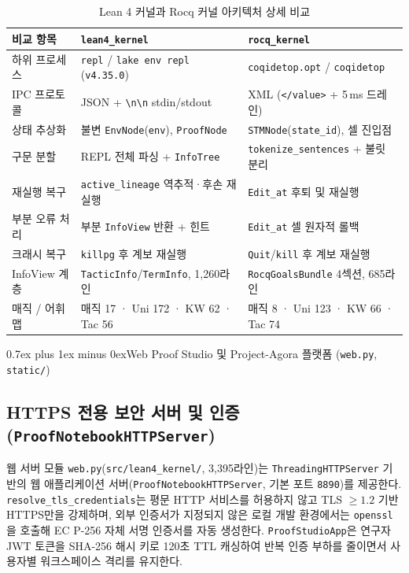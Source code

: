 \documentclass[journal]{IEEEtran}
\makeatletter
\def\section{\@startsection{section}{1}{\z@}{1.5ex plus 1.5ex minus 0.5ex}%
  {0.7ex plus 1ex minus 0ex}{\normalfont\normalsize\centering\bfseries}}%
\newcommand{\code}[1]{\texttt{#1}}
\makeatother
\begin{document}
\begin{table}[!t]
\caption{Lean 4 커널과 Rocq 커널 아키텍처 상세 비교}
\label{tab:lean_vs_rocq}
\centering
\scriptsize
\begin{tabularx}{\columnwidth}{@{}l X X@{}}
\toprule
\textbf{비교 항목} & \textbf{\code{lean4\_kernel}} & \textbf{\code{rocq\_kernel}} \\
\midrule
하위 프로세스 & \code{repl} / \code{lake env repl} (\code{v4.35.0}) & \code{coqidetop.opt} / \code{coqidetop} \\
IPC 프로토콜 & JSON + \code{\textbackslash n\textbackslash n} stdin/stdout & XML (\code{</value>} + 5\,ms 드레인) \\
상태 추상화 & 불변 \code{EnvNode}(\code{env}), \code{ProofNode} & \code{STMNode}(\code{state\_id}), 셀 진입점 \\
구문 분할 & REPL 전체 파싱 + \code{InfoTree} & \code{tokenize\_sentences} + 불릿 분리 \\
재실행 복구 & \code{active\_lineage} 역추적·후손 재실행 & \code{Edit\_at} 후퇴 및 재실행 \\
부분 오류 처리 & 부분 \code{InfoView} 반환 + 힌트 & \code{Edit\_at} 셀 원자적 롤백 \\
크래시 복구 & \code{killpg} 후 계보 재실행 & \code{Quit}/\code{kill} 후 계보 재실행 \\
InfoView 계층 & \code{TacticInfo}/\code{TermInfo}, 1,260라인 & \code{RocqGoalsBundle} 4섹션, 685라인 \\
매직 / 어휘 맵 & 매직 17 · Uni 172 · KW 62 · Tac 56 & 매직 8 · Uni 123 · KW 66 · Tac 74 \\
\bottomrule
\end{tabularx}
\end{table}

\section{Web Proof Studio 및 Project-Agora 플랫폼 (\code{web.py}, \code{static/})}

\subsection{HTTPS 전용 보안 서버 및 인증 (\code{ProofNotebookHTTPServer})}
웹 서버 모듈 \code{web.py}(\code{src/\allowbreak lean4\_kernel/}, 3,395라인)는 \code{Threading\-HTTP\-Server} 기반의 웹 애플리케이션 서버(\code{Proof\-Notebook\-HTTP\-Server}, 기본 포트 \code{8890})를 제공한다. \code{resolve\_tls\_credentials}는 평문 HTTP 서비스를 허용하지 않고 TLS $\ge 1.2$ 기반 HTTPS만을 강제하며, 외부 인증서가 지정되지 않은 로컬 개발 환경에서는 \code{openssl}을 호출해 EC P-256 자체 서명 인증서를 자동 생성한다. \code{ProofStudioApp}은 연구자 JWT 토큰을 SHA-256 해시 키로 120초 TTL 캐싱하여 반복 인증 부하를 줄이면서 사용자별 워크스페이스 격리를 유지한다.
\end{document}

